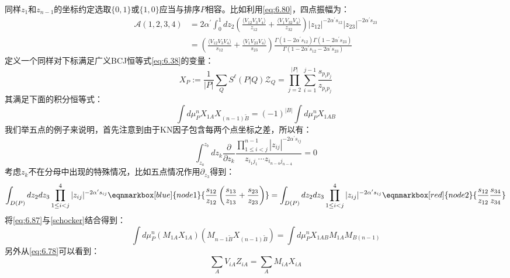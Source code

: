 同样$z_1$和$z_{n-1}$的坐标约定选取$\{0,1\}$或$\{1,0\}$应当与排序$P$相容。比如利用\ref{eq:6.80}，四点振幅为：
\begin{equation}
	\begin{aligned}
		\mathcal{A}(1,2,3,4)&=2\alpha^{\prime}\int_0^1dz_2\left(\frac{\langle V_{12}V_3V_4\rangle}{z_{12}}+\frac{\langle V_1V_{32}V_4\rangle}{z_{32}}\right)|z_{12}|^{-2\alpha^{\prime}s_{12}}|z_{23}|^{-2\alpha^{\prime}s_{23}}\\&=\left(\frac{\langle V_{12}V_3V_4\rangle}{s_{12}}+\frac{\langle V_1V_{23}V_4\rangle}{s_{23}}\right)\frac{\Gamma(1-2\alpha^{\prime}s_{12})\Gamma(1-2\alpha^{\prime}s_{23})}{\Gamma(1-2\alpha^{\prime}s_{12}-2\alpha^{\prime}s_{23})}
	\end{aligned}
\end{equation}
定义一个同样对下标满足广义BCJ恒等式\ref{eq:6.38}的变量：
\begin{equation}
	X_{P}:=\frac{1}{|P|}\sum_{ {Q}}S^{\ell}(P| {Q})\mathcal{Z}_{ {Q}}=\prod_{j=2}^{|P|}\sum_{i=1}^{j-1}\frac{s_{p_ip_j}}{z_{p_ip_j}}
\end{equation}
其满足下面的积分恒等式：
\begin{equation}
	\label{eq:6.87}
	\int d\mu_P^nX_{1A}X_{(n-1)\tilde{B}}=(-1)^{|B|}\int d\mu_P^nX_{1AB}
\end{equation}
我们举五点的例子来说明，首先注意到由于KN因子包含每两个点坐标之差，所以有：
\begin{equation}
	\int_{z_a}^{z_b}dz_k\frac{\partial}{\partial z_k}\frac{\prod_{1\leq i<j}^{n-1}|z_{ij}|^{-2\alpha^{\prime}s_{ij}}}{z_{i_1j_1}\cdots z_{i_{n-4}j_{n-4}}}=0
\end{equation}
考虑$z_k$不在分母中出现的特殊情况，比如五点情况作用$\partial_{z_3}$得到：
\begin{equation}
	\int_{D(P)}dz_2dz_3\prod_{1\leq i<j}^4|z_{ij}|^{-2\alpha^{\prime}s_{ij}}
	\eqnmarkbox[blue]{node1}{\frac{s_{12}}{z_{12}}\left(\frac{s_{13}}{z_{13}}+\frac{s_{23}}{z_{23}}\right)}
	=\int_{D(P)}dz_2dz_3\prod_{1\leq i<j}^4|z_{ij}|^{-2\alpha^{\prime}s_{ij}}
	\eqnmarkbox[red]{node2}{\frac{s_{12}}{z_{12}}\frac{s_{34}}{z_{34}}}
\end{equation}
将\ref{eq:6.87}与\ref{schocker}结合得到：
\begin{equation}
	\int d\mu_P^n(M_{1A}X_{1A})(M_{n-1\tilde{B}}X_{(n-1)\tilde{B}})=\int d\mu_P^nX_{1AB}M_{1A}M_{B(n-1)}
\end{equation}
另外从\ref{eq:6.78}可以看到：
\begin{equation}
	\sum_AV_{iA}Z_{iA}=\sum_AM_{iA}X_{iA}
\end{equation}
